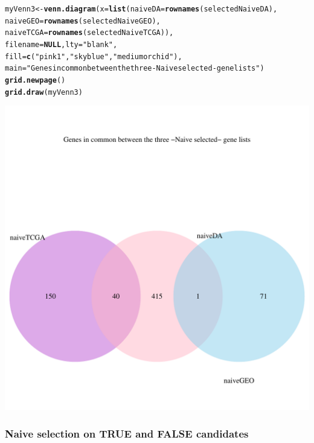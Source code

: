 \documentclass[a4paper,10pt]{article}\usepackage[]{graphicx}\usepackage[]{color}
\makeatletter
\def\maxwidth{ %
  \ifdim\Gin@nat@width>\linewidth
    \linewidth
  \else
    \Gin@nat@width
  \fi
}
\newcommand{\hlstr}[1]{\textcolor[rgb]{0.192,0.494,0.8}{#1}}%
\newcommand{\hlstd}[1]{\textcolor[rgb]{0.345,0.345,0.345}{#1}}%
\newcommand{\hlkwa}[1]{\textcolor[rgb]{0.161,0.373,0.58}{\textbf{#1}}}%
\newcommand{\hlkwb}[1]{\textcolor[rgb]{0.69,0.353,0.396}{#1}}%
\newcommand{\hlkwc}[1]{\textcolor[rgb]{0.333,0.667,0.333}{#1}}%
\newcommand{\hlkwd}[1]{\textcolor[rgb]{0.737,0.353,0.396}{\textbf{#1}}}%
\newenvironment{kframe}{%
 \def\at@end@of@kframe{}%
 \ifinner\ifhmode%
  \def\at@end@of@kframe{\end{minipage}}%
  \begin{minipage}{\columnwidth}%
 \fi\fi%
 \def\FrameCommand##1{\hskip\@totalleftmargin \hskip-\fboxsep
 \colorbox{shadecolor}{##1}\hskip-\fboxsep
     \hskip-\linewidth \hskip-\@totalleftmargin \hskip\columnwidth}%
 \MakeFramed {\advance\hsize-\width
   \@totalleftmargin\z@ \linewidth\hsize
   \@setminipage}}%
 {\par\unskip\endMakeFramed%
 \at@end@of@kframe}
\newenvironment{knitrout}{}{} %
\makeatother
\begin{document}
\begin{knitrout}
\color{fgcolor}\begin{kframe}
\begin{alltt}
\hlstd{myVenn3}\hlkwb{<-} \hlkwd{venn.diagram}\hlstd{(}\hlkwc{x}\hlstd{=}\hlkwd{list}\hlstd{(}\hlkwc{naiveDA}\hlstd{=}\hlkwd{rownames}\hlstd{(selectedNaiveDA),}
                              \hlkwc{naiveGEO}\hlstd{=}\hlkwd{rownames}\hlstd{(selectedNaiveGEO),}
                              \hlkwc{naiveTCGA}\hlstd{=}\hlkwd{rownames}\hlstd{(selectedNaiveTCGA)),}
                              \hlkwc{filename}\hlstd{=}\hlkwa{NULL}\hlstd{,} \hlkwc{lty} \hlstd{=} \hlstr{"blank"}\hlstd{,}
                              \hlkwc{fill}\hlstd{=}\hlkwd{c}\hlstd{(}\hlstr{"pink1"}\hlstd{,} \hlstr{"skyblue"}\hlstd{,} \hlstr{"mediumorchid"}\hlstd{),}
                       \hlkwc{main}\hlstd{=}\hlstr{"Genes in common between the three -Naive selected- gene lists"}\hlstd{)}
\hlkwd{grid.newpage}\hlstd{()}
\hlkwd{grid.draw}\hlstd{(myVenn3)}
\end{alltt}
\end{kframe}
\includegraphics[width=\maxwidth]{figure/vennCommonGenesin3listsNaive-1} 

\end{knitrout}

\subsubsection{Naive selection on TRUE and FALSE candidates}
\end{document}
